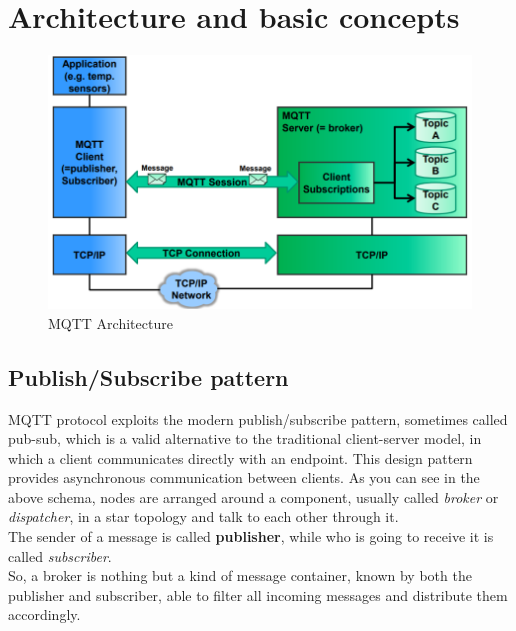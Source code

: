 \documentclass[12pt]{report}
\begin{document}
\section{Architecture and basic concepts}
\begin{figure}[H]
\includegraphics{mqtt_architecture}
\caption{MQTT Architecture}
\end{figure}

\bigskip
\subsection{Publish/Subscribe pattern}
\bigskip
MQTT protocol exploits the modern publish/subscribe pattern, sometimes called pub-sub, which is a valid alternative to the traditional client-server model, in which a client communicates directly with an endpoint.
This design pattern provides asynchronous communication between clients.
As you can see in the above schema, nodes are arranged around a component, usually called \emph{broker} or \emph{dispatcher}, in a star topology and talk to each other through it.\\
The sender of a message is called \textbf{publisher}, while who is going to receive it is called \emph{subscriber}.\\
So, a broker is nothing but a kind of message container, known by both the publisher and subscriber, able to filter all incoming messages and distribute them accordingly.\\
\end{document}
